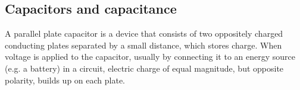 
\subsection{Capacitors and capacitance}

A parallel plate capacitor is a device that consists of two
oppositely charged conducting plates separated by a small
distance, which stores charge. When voltage is applied to the
capacitor, usually by connecting it to an energy source (e.g.\@{} a battery) in a circuit, electric charge of equal magnitude, but opposite
polarity, builds up on each plate.\\

